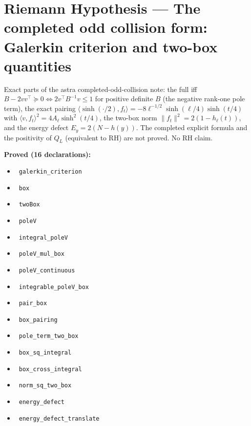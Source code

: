 \documentclass{report}
\theoremstyle{definition}
\begin{document}
\section{Riemann Hypothesis --- The completed odd collision form: Galerkin criterion and two-box quantities}
Exact parts of the astra completed-odd-collision note: the full iff $B-2vv^{\top}\succeq0\iff 2v^{\top}B^{-1}v\le1$ for positive definite $B$ (the negative rank-one pole term), the exact pairing $\langle\sinh(\cdot/2),f_t\rangle=-8\ell^{-1/2}\sinh(\ell/4)\sinh(t/4)$ with $\langle v,f_t\rangle^2=4A_\ell\sinh^2(t/4)$, the two-box norm $\|f_t\|^2=2(1-h_\ell(t))$, and the energy defect $E_y=2(N-h(y))$. The completed explicit formula and the positivity of $Q_L$ (equivalent to RH) are not proved. No RH claim.

\noindent\textbf{Proved (16 declarations):}
\begin{itemize}
  \item {}\leanok\ \texttt{galerkin\_criterion}
  \item {}\leanok\ \texttt{box}
  \item {}\leanok\ \texttt{twoBox}
  \item {}\leanok\ \texttt{poleV}
  \item {}\leanok\ \texttt{integral\_poleV}
  \item {}\leanok\ \texttt{poleV\_mul\_box}
  \item {}\leanok\ \texttt{poleV\_continuous}
  \item {}\leanok\ \texttt{integrable\_poleV\_box}
  \item {}\leanok\ \texttt{pair\_box}
  \item {}\leanok\ \texttt{box\_pairing}
  \item {}\leanok\ \texttt{pole\_term\_two\_box}
  \item {}\leanok\ \texttt{box\_sq\_integral}
  \item {}\leanok\ \texttt{box\_cross\_integral}
  \item {}\leanok\ \texttt{norm\_sq\_two\_box}
  \item {}\leanok\ \texttt{energy\_defect}
  \item {}\leanok\ \texttt{energy\_defect\_translate}
\end{itemize}
\end{document}
